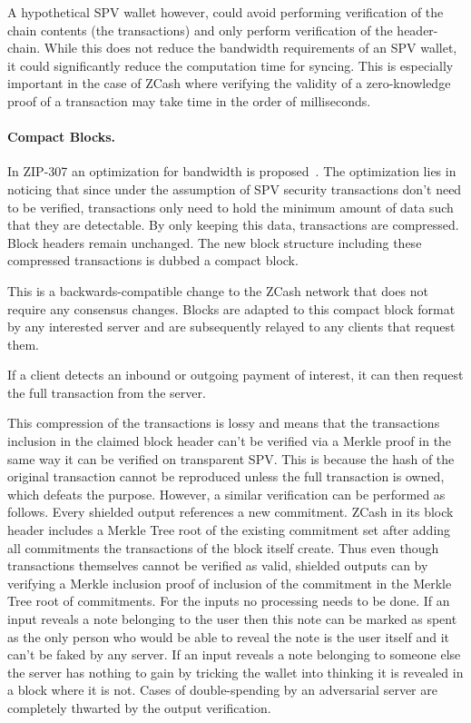 A hypothetical SPV wallet however, could avoid performing verification of the chain contents (the transactions) and only perform verification of the header-chain. While this does not reduce the bandwidth requirements of an SPV wallet, it could significantly reduce the computation time for syncing. This is especially important in the case of ZCash where verifying the validity of a zero-knowledge proof of a transaction may take time in the order of milliseconds.

\paragraph{Compact Blocks.}
In ZIP-307 an optimization for bandwidth is proposed~\cite{compact-blocks}. The optimization lies in noticing that since under the assumption of SPV security transactions don't need to be verified, transactions only need to hold the minimum amount of data such that they are detectable. By only keeping this data, transactions are compressed. Block headers remain unchanged. The new block structure including these compressed transactions is dubbed a compact block.

This is a backwards-compatible change to the ZCash network that does not require any consensus changes. Blocks are adapted to this compact block format by any interested server and are subsequently relayed to any clients that request them.

If a client detects an inbound or outgoing payment of interest, it can then request the full transaction from the server.

This compression of the transactions is lossy and means that the transactions inclusion in the claimed block header can't be verified via a Merkle proof in the same way it can be verified on transparent SPV. This is because the hash of the original transaction cannot be reproduced unless the full transaction is owned, which defeats the purpose. However, a similar verification can be performed as follows. Every shielded output references a new commitment. ZCash in its block header includes a Merkle Tree root of the existing commitment set after adding all commitments the transactions of the block itself create. Thus even though transactions themselves cannot be verified as valid, shielded outputs can by verifying a Merkle inclusion proof of inclusion of the commitment in the Merkle Tree root of commitments. For the inputs no processing needs to be done. If an input reveals a note belonging to the user then this note can be marked as spent as the only person who would be able to reveal the note is the user itself and it can't be faked by any server. If an input reveals a note belonging to someone else the server has nothing to gain by tricking the wallet into thinking it is revealed in a block where it is not. Cases of double-spending by an adversarial server are completely thwarted by the output verification.


